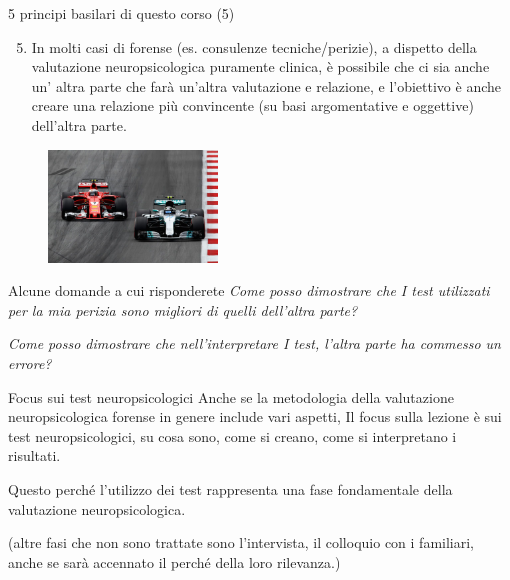 \documentclass[
  ignorenonframetext,
]{beamer}
\providecommand{\tightlist}{%
  \setlength{\itemsep}{0pt}\setlength{\parskip}{0pt}}
\begin{document}
\begin{frame}{5 principi basilari di questo corso (5)}
\label{principi-basilari-di-questo-corso-5}
\begin{enumerate}
\setcounter{enumi}{4}
\tightlist
\item
  In molti casi di forense (es. consulenze tecniche/perizie), a dispetto
  della valutazione neuropsicologica puramente clinica, è possibile che
  ci sia anche un' altra parte che farà un'altra valutazione e
  relazione, e l'obiettivo è anche creare una relazione più convincente
  (su basi argomentative e oggettive) dell'altra parte. \vspace{2em}
\end{enumerate}

\pause
\begin{figure}
\includegraphics[width=0.4\textwidth]{Figures/F1_2.jpg}
\end{figure}
\end{frame}

\begin{frame}{Alcune domande a cui risponderete}
\label{alcune-domande-a-cui-risponderete}
\emph{Come posso dimostrare che I test utilizzati per la mia perizia
sono migliori di quelli dell'altra parte?}

\emph{Come posso dimostrare che nell'interpretare I test, l'altra parte
ha commesso un errore?}
\end{frame}

\begin{frame}{Focus sui test neuropsicologici}
\label{focus-sui-test-neuropsicologici}
Anche se la metodologia della valutazione neuropsicologica forense in
genere include vari aspetti, Il focus sulla lezione è sui test
neuropsicologici, su cosa sono, come si creano, come si interpretano i
risultati.

Questo perché l'utilizzo dei test rappresenta una fase fondamentale
della valutazione neuropsicologica.

\pause

(altre fasi che non sono trattate sono l'intervista, il colloquio con i
familiari, anche se sarà accennato il perché della loro rilevanza.)
\end{frame}
\end{document}
